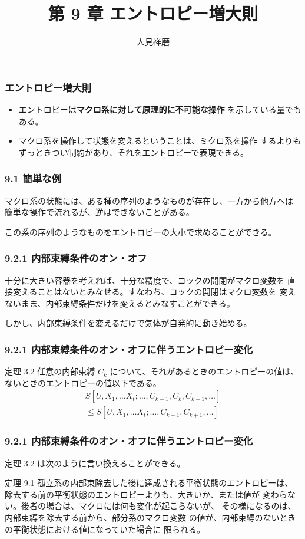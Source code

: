 \documentclass[aspectratio=149]{beamer}
\author{人見祥磨}
\title{第 9 章 エントロピー増大則}
\newcommand{\hmemph}[1]{\textbf{#1}}
\begin{document}
\begin{frame}
	\maketitle
\end{frame}

\begin{frame}
	\frametitle{エントロピー増大則}
	\begin{itemize}
		\item エントロピーは\hmemph{マクロ系に対して原理的に不可能な操作}
			を示している量でもある。
		\item マクロ系を操作して状態を変えるということは、ミクロ系を操作
			するよりもずっときつい制約があり、それをエントロピーで表現できる。
	\end{itemize}
\end{frame}

\begin{frame}
	\frametitle{9.1 簡単な例}
	マクロ系の状態には、ある種の序列のようなものが存在し、一方から他方へは
	簡単な操作で流れるが、逆はできないことがある。
	
	この系の序列のようなものをエントロピーの大小で求めることができる。
\end{frame}

\begin{frame}
	\frametitle{9.2.1 内部束縛条件のオン・オフ}
	十分に大きい容器を考えれば、十分な精度で、コックの開閉がマクロ変数を
	直接変えることはないとみなせる。すなわち、コックの開閉はマクロ変数を
	変えないまま、内部束縛条件だけを変えるとみなすことができる。
	
	しかし、内部束縛条件を変えるだけで気体が自発的に動き始める。
\end{frame}

\begin{frame}
	\frametitle{9.2.1 内部束縛条件のオン・オフに伴うエントロピー変化}
	\begin{block}{定理 3.2}
		任意の内部束縛 \(C_k\) について、それがあるときのエントロピーの値は、
		ないときのエントロピーの値以下である。
		\begin{multline}
			S[U,X_1,\dots X_t;\dots,C_{k-1},C_k,C_{k+1},\dotsc]\\
			\leq S[U,X_1,\dots X_t;\dots,C_{k-1},C_{k+1},\dotsc]\tag{3.38}
		\end{multline}
	\end{block}
\end{frame}

\begin{frame}
	\frametitle{9.2.1 内部束縛条件のオン・オフに伴うエントロピー変化}
	定理 3.2 は次のように言い換えることができる。
	\begin{block}{定理 9.1}
		孤立系の内部束除去した後に達成される平衡状態のエントロピーは、
		除去する前の平衡状態のエントロピーよりも、大きいか、または値が
		変わらない。後者の場合は、マクロには何も変化が起こらないが、
		その様になるのは、内部束縛を除去する前から、部分系のマクロ変数
		の値が、内部束縛のないときの平衡状態における値になっていた場合に
		限られる。
	\end{block}
\end{frame}
\end{document}

